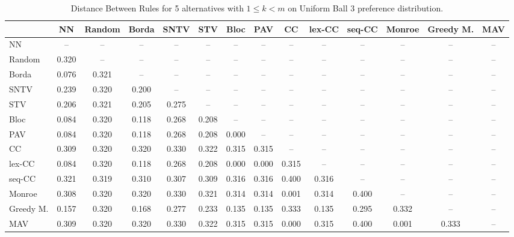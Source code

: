 
\begin{table*}
\centering
\begin{tabular}{lccccccccccccc}
\toprule
 & NN & Random & Borda & SNTV & STV & Bloc & PAV & CC & lex-CC & seq-CC & Monroe & Greedy M. & MAV \\
\midrule
NN & -- & -- & -- & -- & -- & -- & -- & -- & -- & -- & -- & -- & -- \\
Random & 0.320 & -- & -- & -- & -- & -- & -- & -- & -- & -- & -- & -- & -- \\
Borda & 0.076 & 0.321 & -- & -- & -- & -- & -- & -- & -- & -- & -- & -- & -- \\
SNTV & 0.239 & 0.320 & 0.200 & -- & -- & -- & -- & -- & -- & -- & -- & -- & -- \\
STV & 0.206 & 0.321 & 0.205 & 0.275 & -- & -- & -- & -- & -- & -- & -- & -- & -- \\
Bloc & 0.084 & 0.320 & 0.118 & 0.268 & 0.208 & -- & -- & -- & -- & -- & -- & -- & -- \\
PAV & 0.084 & 0.320 & 0.118 & 0.268 & 0.208 & 0.000 & -- & -- & -- & -- & -- & -- & -- \\
CC & 0.309 & 0.320 & 0.320 & 0.330 & 0.322 & 0.315 & 0.315 & -- & -- & -- & -- & -- & -- \\
lex-CC & 0.084 & 0.320 & 0.118 & 0.268 & 0.208 & 0.000 & 0.000 & 0.315 & -- & -- & -- & -- & -- \\
seq-CC & 0.321 & 0.319 & 0.310 & 0.307 & 0.309 & 0.316 & 0.316 & 0.400 & 0.316 & -- & -- & -- & -- \\
Monroe & 0.308 & 0.320 & 0.320 & 0.330 & 0.321 & 0.314 & 0.314 & 0.001 & 0.314 & 0.400 & -- & -- & -- \\
Greedy M. & 0.157 & 0.320 & 0.168 & 0.277 & 0.233 & 0.135 & 0.135 & 0.333 & 0.135 & 0.295 & 0.332 & -- & -- \\
MAV & 0.309 & 0.320 & 0.320 & 0.330 & 0.322 & 0.315 & 0.315 & 0.000 & 0.315 & 0.400 & 0.001 & 0.333 & -- \\
\bottomrule
\end{tabular}

\caption{Distance Between Rules for 5 alternatives with $1 \leq k < m$ on Uniform Ball 3 preference distribution.}
\end{table*}
